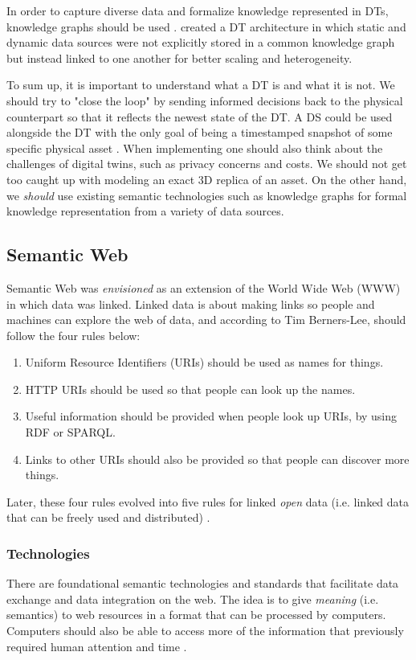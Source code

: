 \documentclass{article}
\begin{document}
In order to capture diverse data and formalize knowledge represented in DTs, knowledge graphs should be used \cite{kamburjan_programming_2021, waszak_let_2022}. \citeauthor{waszak_let_2022} created a DT architecture in which static and dynamic data sources were not explicitly stored in a common knowledge graph but instead linked to one another for better scaling and heterogeneity.

To sum up, it is important to understand what a DT is and what it is not. We should try to "close the loop" by sending informed decisions back to the physical counterpart so that it reflects the newest state of the DT. A DS could be used alongside the DT with the only goal of being a timestamped snapshot of some specific physical asset \cite{bergs_concept_2021}. When implementing one should also think about the challenges of digital twins, such as privacy concerns and costs. We should not get too caught up with modeling an exact 3D replica of an asset. On the other hand, we \emph{should} use existing semantic technologies such as knowledge graphs for formal knowledge representation from a variety of data sources.


\subsection{Semantic Web}
Semantic Web was \emph{envisioned} as an extension of the World Wide Web (WWW) in which data was linked. Linked data is about making links so people and machines can explore the web of data, and according to Tim Berners-Lee, should follow the four rules \cite{tim_berners-lee_linked_nodate} below: 

\begin{enumerate}
    \item Uniform Resource Identifiers (URIs) should be used as names for things.
    \item HTTP URIs should be used so that people can look up the names.
    \item Useful information should be provided when people look up URIs, by using RDF or SPARQL.
    \item Links to other URIs should also be provided so that people can discover more things.
\end{enumerate}

Later, these four rules evolved into five rules for linked \emph{open} data (i.e. linked data that can be freely used and distributed) \cite{noauthor_5_nodate}.  

\subsubsection{Technologies}\label{subsubsec:Technologies}
There are foundational semantic technologies and standards that facilitate data exchange and data integration on the web. The idea is to give \emph{meaning} (i.e. semantics) to web resources in a format that can be processed by computers. Computers should also be able to access more of the information that previously required human attention and time \cite{hitzler_foundations_2009}.
\end{document}
